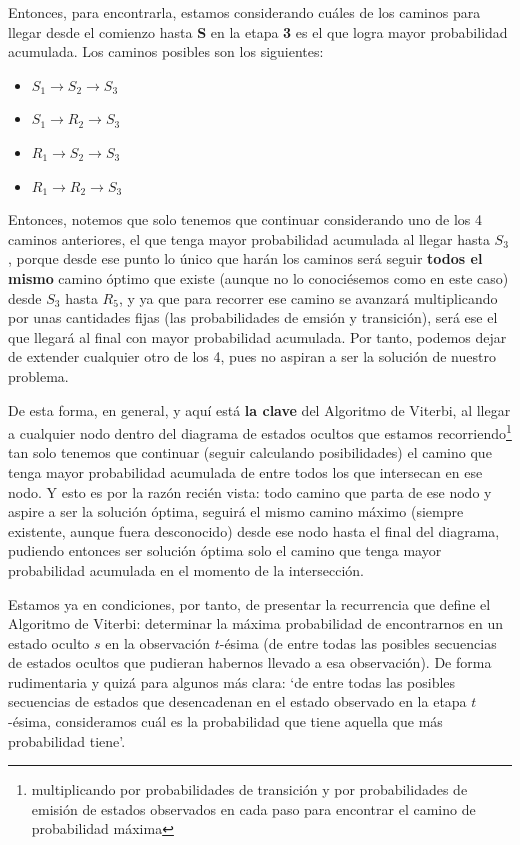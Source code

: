 \documentclass{article}
\begin{document}
\vspace{0.5cm}


Entonces, para encontrarla, estamos considerando cuáles de los caminos para llegar desde el comienzo hasta
\textbf{S} en la etapa \textbf{3} es el que logra mayor probabilidad acumulada. Los caminos posibles son los siguientes:
\begin{itemize}
    \item $S_1 \to S_2 \to S_3$ 
    \item $S_1 \to R_2 \to S_3$ 
    \item $R_1 \to S_2 \to S_3$ 
    \item $R_1 \to R_2 \to S_3$ 
\end{itemize}

Entonces, notemos que solo tenemos que continuar considerando uno de los 4 caminos anteriores, el que tenga
mayor probabilidad acumulada al llegar hasta $S_3$, porque desde
ese punto lo único que harán los caminos será seguir \textbf{todos el mismo} camino óptimo
que existe (aunque no lo conociésemos como en este caso) desde 
$S_3$ hasta $R_5$, y ya que para recorrer
ese camino se avanzará multiplicando por unas cantidades
fijas (las probabilidades de emsión y transición), será ese el que llegará al final
con mayor probabilidad acumulada. Por tanto, podemos
dejar de extender cualquier otro de los 4, pues no aspiran
a ser la solución de nuestro problema.

De esta forma, en general, y aquí está \textbf{la clave} del 
Algoritmo de Viterbi, al llegar a cualquier nodo dentro
del diagrama de estados ocultos que estamos recorriendo\footnote{multiplicando por probabilidades de transición y 
por probabilidades de emisión de estados observados en cada paso
para encontrar el camino de probabilidad máxima} tan solo
tenemos que continuar (seguir calculando posibilidades) el
camino que tenga mayor probabilidad acumulada de entre todos
los que intersecan en ese nodo. Y esto es por la razón recién vista: todo camino que parta de ese nodo y aspire a ser la solución óptima, seguirá el mismo camino máximo (siempre existente, aunque fuera desconocido) desde ese nodo hasta el final del diagrama, pudiendo entonces ser solución óptima solo
el camino que tenga mayor probabilidad acumulada en el 
momento de la intersección.

\medskip

Estamos ya en condiciones, por tanto, de presentar
la recurrencia que define el Algoritmo de Viterbi: determinar 
la máxima probabilidad de encontrarnos en un estado oculto $s$ en la observación $t$-ésima (de entre todas las posibles
secuencias de estados ocultos que pudieran habernos
llevado a esa observación). De forma rudimentaria y quizá
para algunos más clara: `de entre todas las posibles secuencias
de estados que desencadenan en el estado observado en la etapa
$t$-ésima, consideramos cuál es la probabilidad que tiene
aquella que más probabilidad tiene'.
\end{document}
